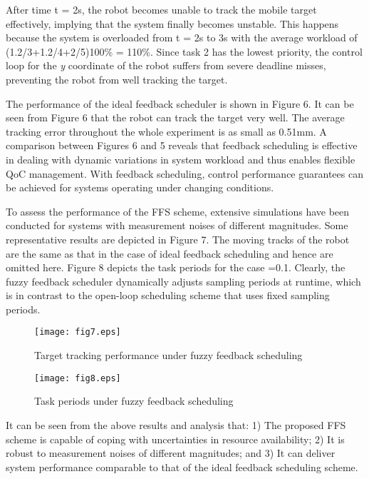 \documentclass[12pt,a4paper]{ijicic}
\begin{document}
After time t = 2s, the robot becomes unable to track the mobile
target effectively, implying that the system finally becomes
unstable. This happens because the system is overloaded from t = 2s
to 3s with the average workload of (1.2/3+1.2/4+2/5)100\% =
110\%. Since task 2 has the lowest priority, the control loop for
the \emph{y} coordinate of the robot suffers from severe deadline
misses, preventing the robot from well tracking the target.

The performance of the ideal feedback scheduler is shown in Figure
6. It can be seen from Figure 6 that the robot can track the target
very well. The average tracking error throughout the whole
experiment is as small as 0.51mm. A comparison between Figures 6 and
5 reveals that feedback scheduling is effective in dealing with
dynamic variations in system workload and thus enables flexible QoC
management. With feedback scheduling, control performance guarantees
can be achieved for systems operating under changing conditions.

To assess the performance of the FFS scheme, extensive simulations
have been conducted for systems with measurement noises of different
magnitudes. Some representative results are depicted in Figure 7.
The moving tracks of the robot are the same as that in the case of
ideal feedback scheduling and hence are omitted here. Figure 8
depicts the task periods for the case =0.1. Clearly, the fuzzy
feedback scheduler dynamically adjusts sampling periods at runtime,
which is in contrast to the open-loop scheduling scheme that uses
fixed sampling periods.

\begin{figure}[htbp!]
\begin{minipage}[t]{0.47\textwidth} \centering
\texttt{[image: fig7.eps]}
\caption{Target tracking performance under fuzzy feedback
scheduling} \label{fig:7}
\end{minipage}\begin{minipage}[t]{0.47\textwidth}
\texttt{[image: fig8.eps]}
\caption{Task periods under fuzzy feedback scheduling}
\label{fig:8}
\end{minipage}
\end{figure}

It can be seen from the above results and analysis that: 1) The
proposed FFS scheme is capable of coping with uncertainties in
resource availability; 2) It is robust to measurement noises of
different magnitudes; and 3) It can deliver system performance
comparable to that of the ideal feedback scheduling scheme.
\end{document}

